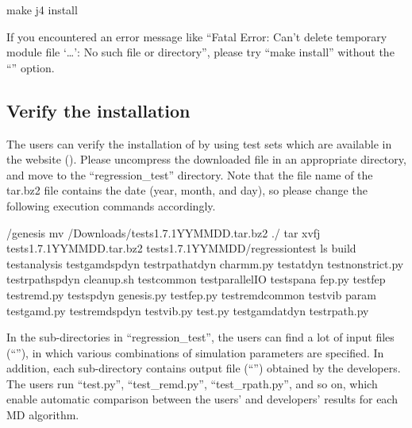 \documentclass[a4paper,11pt,oneside,english]{sphinxmanual}
\begin{document}
\begin{sphinxVerbatim}[commandchars=\\\{\}]
\PYGZdl{} make \PYGZhy{}j4 install
\end{sphinxVerbatim}

If you encountered an error message like “Fatal Error: Can’t delete temporary module
file ‘…’: No such file or directory”, please try “make install”
without the “” option.

\clearpage


\subsection{Verify the installation}
\label{\detokenize{01_Getting_Started:verify-the-installation}}\label{\detokenize{01_Getting_Started:verify-installation}}
The users can verify the installation of  by using test sets
which are available in the  website
().
Please uncompress the downloaded file in an appropriate directory,
and move to the “regression\_test” directory.
Note that the file name of the tar.bz2 file contains the date (year, month, and day),
so please change the following execution commands accordingly.

\begin{sphinxVerbatim}[commandchars=\\\{\}]
\PYGZdl{}  /genesis
\PYGZdl{} mv \PYGZti{}/Downloads/tests\PYGZhy{}1.7.1\PYGZus{}YYMMDD.tar.bz2 ./
\PYGZdl{} tar xvfj tests\PYGZhy{}1.7.1\PYGZus{}YYMMDD.tar.bz2
\PYGZdl{}  tests\PYGZhy{}1.7.1\PYGZus{}YYMMDD/regression\PYGZus{}test
\PYGZdl{} ls
build       test\PYGZus{}analysis    test\PYGZus{}gamd\PYGZus{}spdyn    test\PYGZus{}rpath\PYGZus{}atdyn
charmm.py   test\PYGZus{}atdyn       test\PYGZus{}nonstrict.py  test\PYGZus{}rpath\PYGZus{}spdyn
cleanup.sh  test\PYGZus{}common      test\PYGZus{}parallel\PYGZus{}IO   test\PYGZus{}spana
fep.py      test\PYGZus{}fep         test\PYGZus{}remd.py       test\PYGZus{}spdyn
genesis.py  test\PYGZus{}fep.py      test\PYGZus{}remd\PYGZus{}common   test\PYGZus{}vib
param       test\PYGZus{}gamd.py     test\PYGZus{}remd\PYGZus{}spdyn    test\PYGZus{}vib.py
test.py     test\PYGZus{}gamd\PYGZus{}atdyn  test\PYGZus{}rpath.py
\end{sphinxVerbatim}

In the sub-directories in “regression\_test”, the users can find a lot of input files (“”),
in which various combinations of simulation parameters are specified.
In addition, each sub-directory contains output file (“”) obtained by the developers.
The users run “test.py”, “test\_remd.py”, “test\_rpath.py”, and so on,
which enable automatic comparison between the users’ and developers’
results for each MD algorithm.
\end{document}
